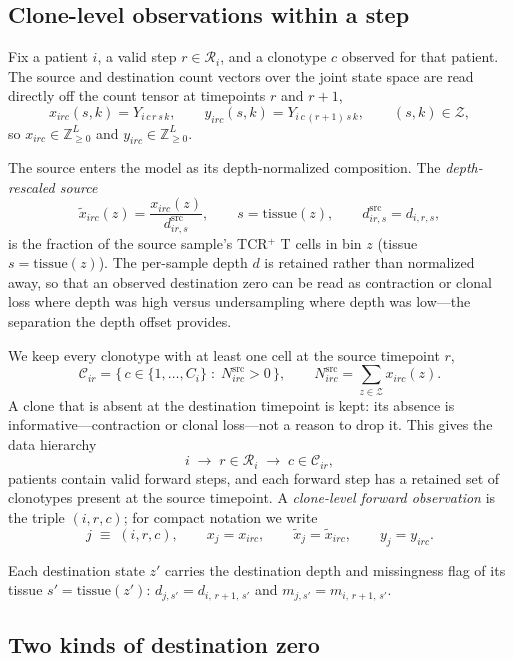 \documentclass[11pt]{article}
\newcommand{\Znn}{\mathbb{Z}_{\geq 0}}            %
\newcommand{\Zsp}{\mathcal{Z}}                    %
\newcommand{\Csp}{\mathcal{C}}                    %
\newcommand{\Rsp}{\mathcal{R}}                    %
\newcommand{\Nsrc}{N^{\mathrm{src}}}
\newcommand{\dsrc}{d^{\mathrm{src}}}
\theoremstyle{definition}
\begin{document}
\subsection{Clone-level observations within a step}

Fix a patient $i$, a valid step $r \in \Rsp_i$, and a clonotype $c$ observed for
that patient. The source and destination count vectors over the joint state
space are read directly off the count tensor at timepoints $r$ and $r+1$,
\[
  x_{irc}(s,k) = Y_{i\, c\, r\, s\, k},
  \qquad
  y_{irc}(s,k) = Y_{i\, c\, (r+1)\, s\, k},
  \qquad (s,k)\in\Zsp,
\]
so $x_{irc} \in \Znn^{L}$ and $y_{irc} \in \Znn^{L}$.

The source enters the model as its depth-normalized composition. The
\emph{depth-rescaled source}
\[
  \tilde{x}_{irc}(z) = \frac{x_{irc}(z)}{\dsrc_{ir,s}},
  \qquad s = \mathrm{tissue}(z),
  \qquad \dsrc_{ir,s} = d_{i,r,s},
\]
is the fraction of the source sample's TCR$^+$ T cells in bin $z$ (tissue
$s = \mathrm{tissue}(z)$). The per-sample depth $d$ is retained rather than
normalized away, so that an observed destination zero can be read as contraction
or clonal loss where depth was high versus undersampling where depth was
low---the separation the depth offset provides.

We keep every clonotype with at least one cell at the source timepoint $r$,
\[
  \Csp_{ir}
  =
  \bigl\{\,
    c \in \{1,\ldots,C_{i}\}
    \;:\;
    \Nsrc_{irc} > 0
  \,\bigr\},
  \qquad
  \Nsrc_{irc} = \sum_{z\in\Zsp} x_{irc}(z) .
\]
A clone that is absent at the destination timepoint is kept: its absence is
informative---contraction or clonal loss---not a reason to drop it. This gives
the data hierarchy
\[
  i
  \;\longrightarrow\;
  r \in \Rsp_i
  \;\longrightarrow\;
  c \in \Csp_{ir},
\]
patients contain valid forward steps, and each forward step has a retained set
of clonotypes present at the source timepoint. A \emph{clone-level forward
observation} is the triple $(i,r,c)$; for compact notation we write
\[
  j \;\equiv\; (i,r,c),
  \qquad
  x_j = x_{irc},
  \qquad
  \tilde{x}_j = \tilde{x}_{irc},
  \qquad
  y_j = y_{irc} .
\]

Each destination state $z'$ carries the destination depth and missingness flag
of its tissue $s' = \mathrm{tissue}(z')$:
$d_{j,s'} = d_{i,\,r+1,\,s'}$ and $m_{j,s'} = m_{i,\,r+1,\,s'}$.

\subsection{Two kinds of destination zero}
\end{document}
